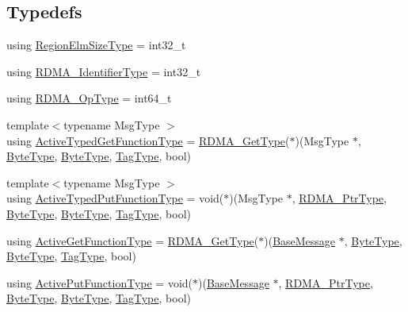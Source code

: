 \subsection*{Typedefs}
\begin{DoxyCompactItemize}
\item 
using \hyperlink{namespacevt_1_1rdma_ac07ef96e399913495fde1da0f83f684c}{Region\+Elm\+Size\+Type} = int32\+\_\+t
\item 
using \hyperlink{namespacevt_1_1rdma_a3b7f2eba1e9063a37d9301061c1432f1}{R\+D\+M\+A\+\_\+\+Identifier\+Type} = int32\+\_\+t
\item 
using \hyperlink{namespacevt_1_1rdma_a9b966d9780a2b41afe7cd7b7b4b20300}{R\+D\+M\+A\+\_\+\+Op\+Type} = int64\+\_\+t
\item 
{\footnotesize template$<$typename Msg\+Type $>$ }\\using \hyperlink{namespacevt_1_1rdma_a903d8f605dadc2456d4a1c6fcb83eda4}{Active\+Typed\+Get\+Function\+Type} = \hyperlink{namespacevt_a1cab7f4860f65a49ad2c042d6240f288}{R\+D\+M\+A\+\_\+\+Get\+Type}($\ast$)(Msg\+Type $\ast$, \hyperlink{namespacevt_aab8d55968084610ce3b17057981e9300}{Byte\+Type}, \hyperlink{namespacevt_aab8d55968084610ce3b17057981e9300}{Byte\+Type}, \hyperlink{namespacevt_a84ab281dae04a52a4b243d6bf62d0e52}{Tag\+Type}, bool)
\item 
{\footnotesize template$<$typename Msg\+Type $>$ }\\using \hyperlink{namespacevt_1_1rdma_a56f7eb7ecfa7e6824d3abb4afb634a37}{Active\+Typed\+Put\+Function\+Type} = void($\ast$)(Msg\+Type $\ast$, \hyperlink{namespacevt_a9e2c953286c7616f7c218e9951790776}{R\+D\+M\+A\+\_\+\+Ptr\+Type}, \hyperlink{namespacevt_aab8d55968084610ce3b17057981e9300}{Byte\+Type}, \hyperlink{namespacevt_aab8d55968084610ce3b17057981e9300}{Byte\+Type}, \hyperlink{namespacevt_a84ab281dae04a52a4b243d6bf62d0e52}{Tag\+Type}, bool)
\item 
using \hyperlink{namespacevt_1_1rdma_af564945ba7e35e15bccfb9c2a8d7ebd7}{Active\+Get\+Function\+Type} = \hyperlink{namespacevt_a1cab7f4860f65a49ad2c042d6240f288}{R\+D\+M\+A\+\_\+\+Get\+Type}($\ast$)(\hyperlink{namespacevt_ac34f95a5e2b8109b55bfba52b074443d}{Base\+Message} $\ast$, \hyperlink{namespacevt_aab8d55968084610ce3b17057981e9300}{Byte\+Type}, \hyperlink{namespacevt_aab8d55968084610ce3b17057981e9300}{Byte\+Type}, \hyperlink{namespacevt_a84ab281dae04a52a4b243d6bf62d0e52}{Tag\+Type}, bool)
\item 
using \hyperlink{namespacevt_1_1rdma_a9adc598d6d34e2ed3c143711992674d8}{Active\+Put\+Function\+Type} = void($\ast$)(\hyperlink{namespacevt_ac34f95a5e2b8109b55bfba52b074443d}{Base\+Message} $\ast$, \hyperlink{namespacevt_a9e2c953286c7616f7c218e9951790776}{R\+D\+M\+A\+\_\+\+Ptr\+Type}, \hyperlink{namespacevt_aab8d55968084610ce3b17057981e9300}{Byte\+Type}, \hyperlink{namespacevt_aab8d55968084610ce3b17057981e9300}{Byte\+Type}, \hyperlink{namespacevt_a84ab281dae04a52a4b243d6bf62d0e52}{Tag\+Type}, bool)

\end{DoxyCompactItemize}
